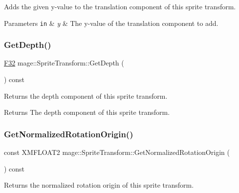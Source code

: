 Adds the given y-\/value to the translation component of this sprite transform.


\begin{DoxyParams}[1]{Parameters}
\mbox{\tt in}  & {\em y} & The y-\/value of the translation component to add. \\
\hline
\end{DoxyParams}
\hypertarget{classmage_1_1_sprite_transform_acbb61149d34be717c43a78fc9113fe9c}{}\label{classmage_1_1_sprite_transform_acbb61149d34be717c43a78fc9113fe9c} 
\subsubsection{\texorpdfstring{Get\+Depth()}{GetDepth()}}
{\footnotesize\ttfamily \hyperlink{namespacemage_aa97e833b45f06d60a0a9c4fc22ae02c0}{F32} mage\+::\+Sprite\+Transform\+::\+Get\+Depth (\begin{DoxyParamCaption}{ }\end{DoxyParamCaption}) const\hspace{0.3cm}{\ttfamily [noexcept]}}

Returns the depth component of this sprite transform.

\begin{DoxyReturn}{Returns}
The depth component of this sprite transform. 
\end{DoxyReturn}
\hypertarget{classmage_1_1_sprite_transform_aae811b88ac3cbd5ac18c67ddd81bef99}{}\label{classmage_1_1_sprite_transform_aae811b88ac3cbd5ac18c67ddd81bef99} 
\subsubsection{\texorpdfstring{Get\+Normalized\+Rotation\+Origin()}{GetNormalizedRotationOrigin()}}
{\footnotesize\ttfamily const X\+M\+F\+L\+O\+A\+T2 mage\+::\+Sprite\+Transform\+::\+Get\+Normalized\+Rotation\+Origin (\begin{DoxyParamCaption}{ }\end{DoxyParamCaption}) const}

Returns the normalized rotation origin of this sprite transform.

